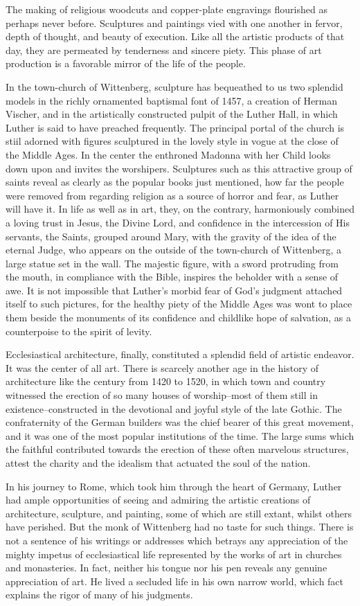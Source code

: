 The making of religious woodcuts and copper-plate engravings
flourished as perhaps never before. Sculptures and paintings vied with
one another in fervor, depth of thought, and beauty of execution.
Like all the artistic products of that day, they are permeated by
tenderness and sincere piety. This phase of art production is a favorable
mirror of the life of the people.

In the town-church of Wittenberg, sculpture has bequeathed to
us two splendid models in the richly ornamented baptismal font
of 1457, a creation of Herman Vischer, and in the artistically constructed
pulpit of the Luther Hall, in which Luther is said to have
preached frequently. The principal portal of the church is stiil
adorned with figures sculptured in the lovely style in vogue at the
close of the Middle Ages. In the center the enthroned Madonna with
her Child looks down upon and invites the worshipers. Sculptures
such as this attractive group of saints reveal as clearly as the popular
books just mentioned, how far the people were removed from regarding religion
as a source of horror and fear, as Luther will have
it. In life as well as in art, they, on the contrary, harmoniously
combined a loving trust in Jesus, the Divine Lord, and confidence
in the intercession of His servants, the Saints, grouped around Mary,
with the gravity of the idea of the eternal Judge, who appears
on the outside of the town-church of Wittenberg, a large statue set
in the wall. The majestic figure, with a sword protruding from the
mouth, in compliance with the Bible, inspires the beholder with a
sense of awe. It is not impossible that Luther’s morbid fear of God’s
judgment attached itself to such pictures, for the healthy piety of
the Middle Ages was wont to place them beside the monuments of
its confidence and childlike hope of salvation, as a counterpoise to
the spirit of levity.

Ecclesiastical architecture, finally, constituted a splendid field of
artistic endeavor. It was the center of all art. There is scarcely another
age in the history of architecture like the century from 1420
to 1520, in which town and country witnessed the erection of so
many houses of worship--most of them still in existence--constructed in
the devotional and joyful style of the late Gothic. The
confraternity of the German builders was the chief bearer of this
great movement, and it was one of the most popular institutions
of the time. The large sums which the faithful contributed towards
the erection of these often marvelous structures, attest the charity
and the idealism that actuated the soul of the nation.

In his journey to Rome, which took him through the heart of
Germany, Luther had ample opportunities of seeing and admiring
the artistic creations of architecture, sculpture, and painting, some
of which are still extant, whilst others have perished. But the monk
of Wittenberg had no taste for such things. There is not a sentence
of his writings or addresses which betrays any appreciation of the
mighty impetus of ecclesiastical life represented by the works of art
in churches and monasteries. In fact, neither his tongue nor his pen
reveals any genuine appreciation of art. He lived a secluded life in
his own narrow world, which fact explains the rigor of many of
his judgments.
